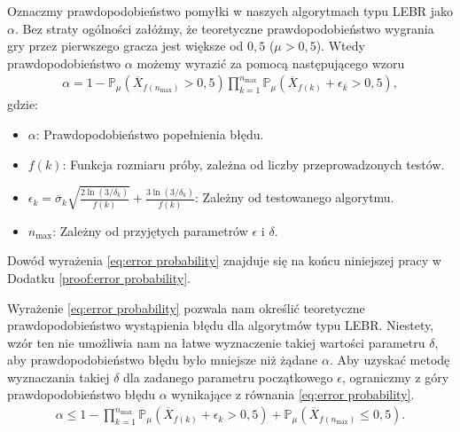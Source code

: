 \documentclass[inzynierska]{pwr_wmat_praca_dyplomowa}
\theoremstyle{plain}
\numberwithin{theorem}{chapter}
\theoremstyle{definition}
\numberwithin{theorem}{chapter}
\newcommand{\probP}{\mathbb{P}}
\newcommand{\nmax}{n_{\text{max}}}
\begin{document}
	Oznaczmy prawdopodobieństwo pomyłki w naszych algorytmach typu LEBR jako $\alpha$. Bez straty ogólności załóżmy, że teoretyczne prawdopodobieństwo wygrania gry przez pierwszego gracza jest większe od $0,5$ ($\mu > 0,5$). Wtedy prawdopodobieństwo $\alpha$ możemy wyrazić za pomocą następującego wzoru
	\begin{gather}
		\label{eq:error probability}
		\alpha = 1 - \probP_{\mu}(\overline{X}_{f(\nmax)} > 0,5)
 \prod^{\nmax}_{k=1} \probP_{\mu}(\overline{X}_{f(k)} +  \epsilon_{k} > 0,5),
	\end{gather}
	gdzie:
	\begin{itemize}
		\item $\alpha$: Prawdopodobieństwo popełnienia błędu.
		\item $f(k)$: Funkcja rozmiaru próby, zależna od liczby przeprowadzonych testów.
		\item $\epsilon_k = \overline{\sigma}_k \sqrt{\frac{2\ln(3/\delta_k)}{f(k)}}+\frac{3\ln(3/\delta_k)}{f(k)}$: Zależny od testowanego algorytmu.
		\item $\nmax$: Zależny od przyjętych parametrów $\epsilon$ i $\delta$.
	\end{itemize}
	Dowód wyrażenia \eqref{eq:error probability} znajduje się na końcu niniejszej pracy w Dodatku \ref{proof:error probability}.
	
	Wyrażenie \eqref{eq:error probability} pozwala nam określić teoretyczne prawdopodobieństwo wystąpienia błędu dla algorytmów typu LEBR. Niestety, wzór ten nie umożliwia nam na łatwe wyznaczenie takiej wartości parametru $\delta$, aby prawdopodobieństwo błędu było mniejsze niż żądane $\alpha$. Aby uzyskać metodę wyznaczania takiej $\delta$ dla zadanego parametru początkowego $\epsilon$, ograniczmy z góry prawdopodobieństwo błędu $\alpha$ wynikające z równania \eqref{eq:error probability}.
	\begin{gather}
		\label{eq:error_probability_limit_1}
		\alpha \le
		  1-\prod^{\nmax}_{k=1} \probP_{\mu}(\overline{X}_{f(k)} +  \epsilon_{k} > 0,5) +
		 \probP_{\mu}(\overline{X}_{f(\nmax)}\le 0,5).
	\end{gather}
\end{document}
